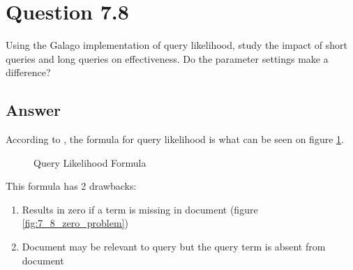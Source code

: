 \documentclass[letterpaper,11pt]{article}
\begin{document}
\noindent\makebox[\linewidth]{\rule{\textwidth}{0.4pt}}

\section*{Question 7.8}
\begin{spverbatim}
Using the Galago implementation of query likelihood, study the impact of short queries and long queries on effectiveness. Do the parameter settings make a difference?
\end{spverbatim}

\subsection*{Answer}
According to \cite{language-model}, the formula for query likelihood is what can be seen on figure \ref*{fig:7_8_likelihood_formula}.

\begin{figure}[H]
	\centering
	\caption{Query Likelihood Formula}
	\label{fig:7_8_likelihood_formula}
\end{figure}

This formula has 2 drawbacks:
\begin{enumerate}
	\item Results in zero if a term is missing in document (figure \ref{fig:7_8_zero_problem})
	\item Document may be relevant to query but the query term is absent from document
\end{enumerate}
\end{document}
